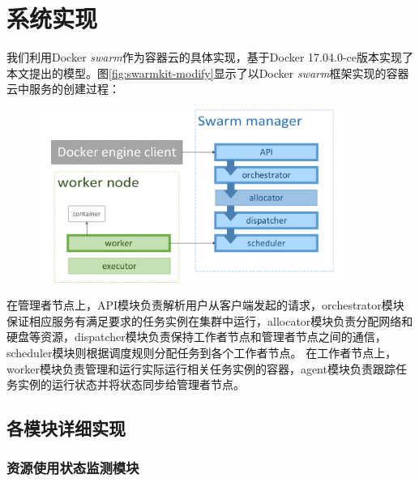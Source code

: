 
\chapter{系统实现}
\label{chap:sys_impl}
我们利用Docker \emph{swarm}作为容器云的具体实现，基于Docker 17.04.0-ce版本实现了本文提出的模型。图\ref{fig:swarmkit-modify}显示了以Docker \emph{swarm}框架实现的容器云中服务的创建过程：
\begin{figure}[htbp]
\centering
\includegraphics[width=0.9\textwidth]{./figure/modification}
\end{figure} 

在管理者节点上，API模块负责解析用户从客户端发起的请求，orchestrator模块保证相应服务有满足要求的任务实例在集群中运行，allocator模块负责分配网络和硬盘等资源，dispatcher模块负责保持工作者节点和管理者节点之间的通信，scheduler模块则根据调度规则分配任务到各个工作者节点。
在工作者节点上，worker模块负责管理和运行实际运行相关任务实例的容器，agent模块负责跟踪任务实例的运行状态并将状态同步给管理者节点。

\section{各模块详细实现}

\subsection{资源使用状态监测模块}
\begin{figure}[!htp]
    \centering
    \resizebox{6cm}{!}{}
\end{figure}

